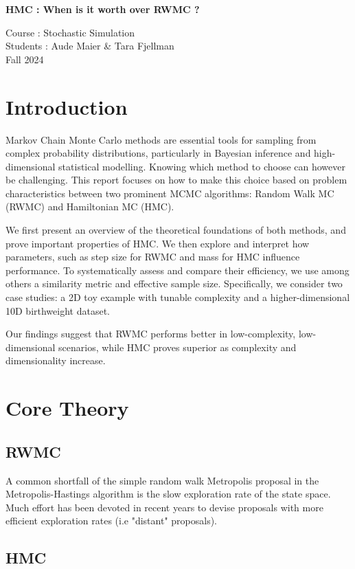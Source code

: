 \documentclass[a4paper, 12pt,oneside]{article}
\begin{document}
 
	\begin{center}
	    \Large
	    \textbf{HMC : When is it worth over RWMC ?} 
	    \vspace{0.4cm}
	    \large

		Course : Stochastic Simulation \\
	    Students : Aude Maier \& Tara Fjellman \\
	    \small{Fall 2024}
	\end{center}

	\section{Introduction}
	Markov Chain Monte Carlo methods are essential tools for sampling from complex probability distributions, particularly in Bayesian inference and high-dimensional statistical modelling. Knowing which method to choose can however be challenging. This report focuses on how to make this choice based on problem characteristics between two prominent MCMC algorithms: Random Walk MC (RWMC) and Hamiltonian MC (HMC). 
	
	We first present an overview of the theoretical foundations of both methods, and prove important properties of HMC.	
	We then explore and interpret how parameters, such as step size for RWMC and mass for HMC influence performance. To systematically assess and compare their efficiency, we use among others a similarity metric and effective sample size. 
	Specifically, we consider two case studies: a 2D toy example with tunable complexity and a higher-dimensional 10D birthweight dataset. 
	
	Our findings suggest that RWMC performs better in low-complexity, low-dimensional scenarios, while HMC proves superior as complexity and dimensionality increase.
	\section{Core Theory}
		\subsection{RWMC}
		A common shortfall of the simple random walk Metropolis proposal in the Metropolis-Hastings algorithm is the slow exploration rate of the state space. Much effort has been devoted in recent years to devise proposals with more efficient exploration rates (i.e "distant" proposals).
		\subsection{HMC}
\end{document}
